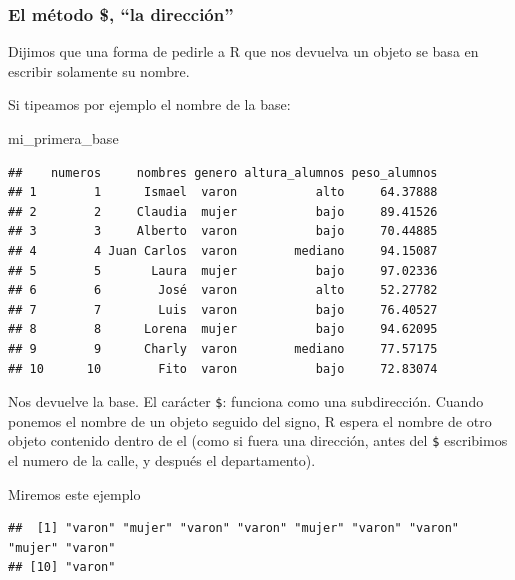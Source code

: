 \documentclass[
]{book}
\newenvironment{Shaded}{\begin{snugshade}}{\end{snugshade}}
\newcommand{\NormalTok}[1]{#1}
\newcommand{\SpecialCharTok}[1]{\textcolor[rgb]{0.00,0.00,0.00}{#1}}
\begin{document}
\hypertarget{el-muxe9todo-la-direcciuxf3n}{%
\subsubsection{El método \$, ``la dirección''}\label{el-muxe9todo-la-direcciuxf3n}}

Dijimos que una forma de pedirle a R que nos devuelva un objeto se basa en escribir solamente su nombre.

Si tipeamos por ejemplo el nombre de la base:

\begin{Shaded}
\begin{Highlighting}[]
\NormalTok{mi\_primera\_base}
\end{Highlighting}
\end{Shaded}

\begin{verbatim}
##    numeros     nombres genero altura_alumnos peso_alumnos
## 1        1      Ismael  varon           alto     64.37888
## 2        2     Claudia  mujer           bajo     89.41526
## 3        3     Alberto  varon           bajo     70.44885
## 4        4 Juan Carlos  varon        mediano     94.15087
## 5        5       Laura  mujer           bajo     97.02336
## 6        6        José  varon           alto     52.27782
## 7        7        Luis  varon           bajo     76.40527
## 8        8      Lorena  mujer           bajo     94.62095
## 9        9      Charly  varon        mediano     77.57175
## 10      10        Fito  varon           bajo     72.83074
\end{verbatim}

Nos devuelve la base.
El carácter \texttt{\$}: funciona como una subdirección.
Cuando ponemos el nombre de un objeto seguido del signo, R espera el nombre de otro objeto contenido dentro de el (como si fuera una dirección, antes del \texttt{\$} escribimos el numero de la calle, y después el departamento).

Miremos este ejemplo

\begin{Shaded}
\end{Shaded}

\begin{verbatim}
##  [1] "varon" "mujer" "varon" "varon" "mujer" "varon" "varon" "mujer" "varon"
## [10] "varon"
\end{verbatim}
\end{document}
